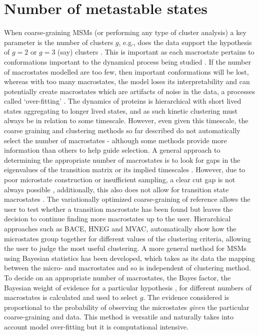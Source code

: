 \section{Number of metastable states}\label{sec:num_metastable}
When coarse-graining MSMs (or performing any type of cluster analysis) a key parameter is the number of clusters $g$, e.g., does the data support the hypothesis of $g=2$ or $g=3$ (say) clusters \cite{milliganExaminationProceduresDetermining1985}. This is important as each macrostate pertains to conformations important to the dynamical process being studied \cite{frauenfelderEnergyLandscapesMotions1991}. If the number of macrostates modelled are too few, then important conformations will be lost, whereas with too many macrostates, the model loses its interpretability and can potentially  create macrostates which are artifacts of noise in the data, a processes called `over-fitting' \cite[chapter 7]{friedman2001elements}. The dynamics of proteins is hierarchical \cite{frauenfelderEnergyLandscapesMotions1991} with short lived states aggregating to longer lived states, and as such kinetic clustering must always be in relation to some timescale. However, even given this timescale, the coarse graining and clustering methods so far described do not automatically select the number of macrostates - although some methods provide more information than others to help guide selection. A general approach to determining the appropriate number of macrostates is to look for gaps in the eigenvalues of the transition matrix or its implied timescales \cite{prinzMarkovModelsMolecular2011, mcgibbonVariationalCrossvalidationSlow2015, deuflhardIdentificationAlmostInvariant2000a}. However, due to poor microstate construction or insufficient sampling, a clear cut gap is not always possible \cite{bowmanQuantitativeComparisonAlternative2013}, additionally, this also does not allow for transition state macrostates \cite{martiniVariationalIdentificationMarkovian2017}. The variationally optimized coarse-graining of reference \cite{martiniVariationalIdentificationMarkovian2017} allows the user to test whether a transition macrostate has been found but leaves the decision to continue finding more macrostates up to the user. Hierarchical approaches such as BACE,  HNEG and MVAC, automatically show how the microstates group together for different values of the clustering criteria, allowing the user to judge the most useful clustering.  A more general method for MSMs using Bayesian statistics has been developed, which takes as its data the mapping between the micro- and macrostates \cite{bacalladoBayesianComparisonMarkov2009a} and so is independent of clustering method. To decide on an appropriate number of macrostates, the Bayes factor, the Bayesian weight of evidence for a particular hypothesis \cite{kassBayesFactors1995}, for different numbers of macrostates is calculated and used to select $g$. The evidence considered is proportional to the probability of observing the microstates \emph{given} the particular coarse-graining and data\cite{bacalladoBayesianComparisonMarkov2009a}. This method is versatile and naturally takes into account model over-fitting \cite{bacalladoBayesianComparisonMarkov2009a} but it is computational intensive.  

